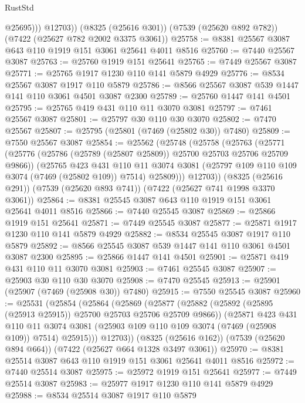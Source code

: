 \begin{lexlean}{RustStd}
\begin{coremodule}
              @25695)))
        @12703))
    (@8325 (@25616 @301))
    (@7539 (@25620 @892 @782))
    (@7422 (@25627 @782 @2002 @3375 @3061))
@25758 := @8381 @25567 @3087 @643 @110 @1919 @151 @3061 @25641 @4011 @8516
@25760 := @7440 @25567 @3087
@25763 := @25760 @1919 @151 @25641
@25765 := @7449 @25567 @3087
@25771 := @25765 @1917 @1230 @110 @141 @5879 @4929
@25776 := @8534 @25567 @3087 @1917 @110 @5879
@25786 := @8566 @25567 @3087 @539 @1447 @141 @110 @3061 @4501 @3087 @2300
@25789 := @25760 @1447 @141 @4501
@25795 := @25765 @419 @431 @110 @11 @3070 @3081
@25797 := @7461 @25567 @3087
@25801 := @25797 @30 @110 @30 @3070
@25802 := @7470 @25567
@25807 := @25795 (@25801 (@7469 (@25802 @30)) @7480)
@25809 := @7550 @25567 @3087
@25854 := @25562
    (@25748
      (@25758
        (@25763
          (@25771
            (@25776 (@25786 (@25789 (@25807 @25809)) @25700 @25703 @25706 @25709 @9866))
            (@25765
              @423
              @431
              @110
              @11
              @3074
              @3081
              (@25797 @109 @110 @109 @3074 (@7469 (@25802 @109)) @7514)
              @25809)))
        @12703))
    (@8325 (@25616 @291))
    (@7539 (@25620 @893 @741))
    (@7422 (@25627 @741 @1998 @3370 @3061))
@25864 := @8381 @25545 @3087 @643 @110 @1919 @151 @3061 @25641 @4011 @8516
@25866 := @7440 @25545 @3087
@25869 := @25866 @1919 @151 @25641
@25871 := @7449 @25545 @3087
@25877 := @25871 @1917 @1230 @110 @141 @5879 @4929
@25882 := @8534 @25545 @3087 @1917 @110 @5879
@25892 := @8566 @25545 @3087 @539 @1447 @141 @110 @3061 @4501 @3087 @2300
@25895 := @25866 @1447 @141 @4501
@25901 := @25871 @419 @431 @110 @11 @3070 @3081
@25903 := @7461 @25545 @3087
@25907 := @25903 @30 @110 @30 @3070
@25908 := @7470 @25545
@25913 := @25901 (@25907 (@7469 (@25908 @30)) @7480)
@25915 := @7550 @25545 @3087
@25960 := @25531
    (@25854
      (@25864
        (@25869
          (@25877
            (@25882 (@25892 (@25895 (@25913 @25915)) @25700 @25703 @25706 @25709 @9866))
            (@25871
              @423
              @431
              @110
              @11
              @3074
              @3081
              (@25903 @109 @110 @109 @3074 (@7469 (@25908 @109)) @7514)
              @25915)))
        @12703))
    (@8325 (@25616 @162))
    (@7539 (@25620 @894 @664))
    (@7422 (@25627 @664 @1328 @3497 @3061))
@25970 := @8381 @25514 @3087 @643 @110 @1919 @151 @3061 @25641 @4011 @8516
@25972 := @7440 @25514 @3087
@25975 := @25972 @1919 @151 @25641
@25977 := @7449 @25514 @3087
@25983 := @25977 @1917 @1230 @110 @141 @5879 @4929
@25988 := @8534 @25514 @3087 @1917 @110 @5879

\end{coremodule}
\end{lexlean}

